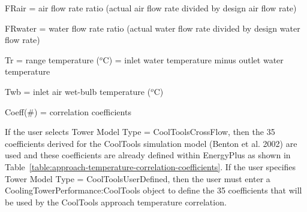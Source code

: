 FRair = air flow rate ratio (actual air flow rate divided by design air flow rate)

FRwater = water flow rate ratio (actual water flow rate divided by design water flow rate)

Tr = range temperature (\(^{o}\)C) = inlet water temperature minus outlet water temperature

Twb = inlet air wet-bulb temperature (\(^{o}\)C)

Coeff(\#) = correlation coefficients

If the user selects Tower Model Type = CoolToolsCrossFlow, then the 35 coefficients derived for the CoolTools simulation model (Benton et al. 2002) are used and these coefficients are already defined within EnergyPlus as shown in Table~\ref{table:approach-temperature-correlation-coefficients}. If the user specifies Tower Model Type = CoolToolsUserDefined, then the user must enter a CoolingTowerPerformance:CoolTools object to define the 35 coefficients that will be used by the CoolTools approach temperature correlation.

